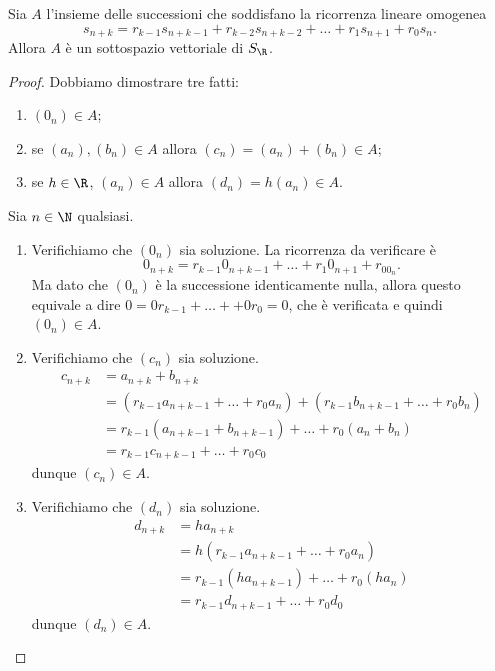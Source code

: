 \begin{proposition}
    Sia $A$ l'insieme delle successioni che soddisfano la ricorrenza lineare omogenea \[
        s_{n+k} = r_{k-1}s_{n+k-1} + r_{k-2}s_{n+k-2} + \dots + r_{1}s_{n+1} + r_0s_n.
    \] Allora $A$ è un sottospazio vettoriale di $S_{\R}$.
\end{proposition}
\begin{proof}
    Dobbiamo dimostrare tre fatti:
    \begin{enumerate}[label={(\roman*)}]
        \item $(0_n) \in A$;
        \item se $(a_n), (b_n) \in A$ allora $(c_n) = (a_n) + (b_n) \in A$;
        \item se $h \in \R$, $(a_n) \in A$ allora $(d_n) = h(a_n) \in A$.
    \end{enumerate}

    Sia $n \in \N$ qualsiasi.
    \begin{enumerate}[label={(\roman*)}]
        \item Verifichiamo che $(0_n)$ sia soluzione. La ricorrenza da verificare è \[
            0_{n+k} = r_{k-1}0_{n+k-1} + \dots + r_{1}0_{n+1} + r_00_n.
        \] Ma dato che $(0_n)$ è la successione identicamente nulla, allora questo equivale a dire $0 = 0r_{k-1} + \dots +  + 0r_0 = 0$, che è verificata e quindi $(0_n) \in A$.
        \item Verifichiamo che $(c_n)$ sia soluzione. \begin{align*}
            c_{n+k} &= a_{n+k} + b_{n+k}\\
            &= (r_{k-1}a_{n+k-1} + \dots + r_0a_n) + (r_{k-1}b_{n+k-1} + \dots + r_0b_n) \\
            &= r_{k-1}(a_{n+k-1} + b_{n+k-1}) + \dots + r_0(a_n + b_n) \\
            &= r_{k-1}c_{n+k-1} + \dots + r_0c_0
        \end{align*}
        dunque $(c_n) \in A$.
        \item Verifichiamo che $(d_n)$ sia soluzione. \begin{align*}
            d_{n+k} &= ha_{n+k}\\
            &= h(r_{k-1}a_{n+k-1} + \dots + r_0a_n)\\
            &= r_{k-1}(ha_{n+k-1}) + \dots + r_0(ha_n) \\
            &= r_{k-1}d_{n+k-1} + \dots + r_0d_0
        \end{align*}
        dunque $(d_n) \in A$. \qedhere
    \end{enumerate}
\end{proof}


